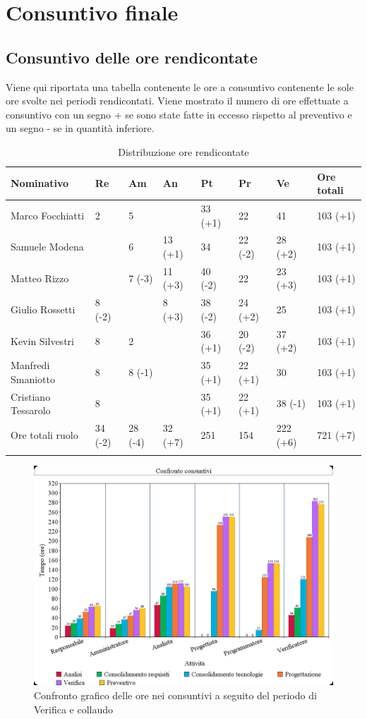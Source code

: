 \documentclass[./PianodiProgetto.tex]{subfiles}
\begin{document}
\section{Consuntivo finale}

\subsection{Consuntivo delle ore rendicontate}
Viene qui riportata una tabella contenente le ore a consuntivo contenente le sole ore svolte
nei periodi rendicontati. Viene mostrato il numero di ore effettuate a consuntivo con un
segno + se sono state fatte in eccesso rispetto al preventivo e un segno - se in quantità
inferiore.

\setlength\LTleft{-22mm}
\begin{longtable}{|p{38mm}|p{15mm}|p{15mm}|p{15mm}|p{15mm}|p{15mm}|p{17mm}|p{18mm}|}
		\hline
		Nominativo&Re&Am&An&Pt&Pr&Ve&Ore totali\\ \hline
		Marco Focchiatti&2&5& &33 (+1)&22&41&103 (+1) \\ \hline
		Samuele Modena& &6&13 (+1)&34&22 (-2)&28 (+2)&103 (+1) \\ \hline
		Matteo Rizzo& &7 (-3)&11 (+3)&40 (-2)&22&23 (+3)&103 (+1) \\ \hline
		Giulio Rossetti&8 (-2)& &8 (+3)&38 (-2)&24 (+2)&25&103 (+1) \\ \hline
		Kevin Silvestri&8&2& &36 (+1)&20 (-2)&37 (+2)&103 (+1) \\ \hline
		Manfredi Smaniotto&8&8 (-1)& &35 (+1)&22 (+1)&30&103 (+1) \\ \hline
		Cristiano Tessarolo&8& & &35 (+1)&22 (+1)&38 (-1)&103 (+1) \\  \hline
		Ore totali ruolo&34 (-2)&28 (-4)&32 (+7)&251&154&222 (+6)&721 (+7) \\ \hline
	\caption{Distribuzione ore rendicontate}
\end{longtable}

\begin{figure}[H]
	\centering
	\includegraphics[width=1\linewidth]{img/grafici/OreConsuntivo/consuntivo-ore-verifica}
	\caption{Confronto grafico delle ore nei consuntivi a seguito del periodo di Verifica e collaudo}
	\label{fig:consuntivo-ore-verifica}
\end{figure}
\end{document}
